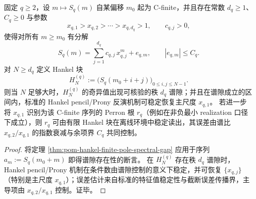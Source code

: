 \begin{corollary}\label{cor:pom-collision-perron-auditable-inversion}
固定 \(q\ge 2\)，设 \(m\mapsto S_q(m)\) 自某偏移 \(m_0\) 起为 C-finite，并且存在常数 \(d_q\ge 1\)、\(C_q\ge 0\) 与参数
\[
x_{q,1}>x_{q,2}>\cdots>x_{q,d_q}>1,
\qquad
c_{q,j}>0,
\]
使得对所有 \(m\ge m_0\) 有分解
\[
S_q(m)=\sum_{j=1}^{d_q}c_{q,j}\,x_{q,j}^{m}+e_{q,m},
\qquad
|e_{q,m}|\le C_q.
\]
对 \(N\ge d_q\) 定义 Hankel 块
\[
H_{N}^{(q)}:=\bigl(S_q(m_0+i+j)\bigr)_{0\le i,j\le N-1}.
\]
则当 \(N\) 足够大时，\(H_N^{(q)}\) 的奇异值出现可核验的秩 \(d_q\) 谱隙；并且在谱隙成立的区间内，标准的 Hankel pencil/Prony 反演机制可稳定恢复主尺度 \(x_{q,1}\)。
若进一步将 \(x_{q,1}\) 识别为该 C-finite 序列的 Perron 根 \(r_q\)（例如在非负最小 realization 口径下成立），则 \(r_q\) 可由有限 Hankel 块在离线环境中稳定读出，其误差由谱比 \(x_{q,2}/x_{q,1}\) 的指数衰减与余项界 \(C_q\) 共同控制。
\end{corollary}
\begin{proof}
将定理 \ref{thm:pom-hankel-finite-pole-spectral-gap} 应用于序列 \(a_m:=S_q(m_0+m)\) 即得谱隙存在性的断言。
在 \(H_N^{(q)}\) 存在秩 \(d_q\) 谱隙时，Hankel pencil/Prony 机制在条件数由谱隙控制的意义下稳定，并可恢复 \(\{x_{q,j}\}\)（特别是主尺度 \(x_{q,1}\)）；误差估计来自标准的特征值稳定性与截断误差传播界，主导项由 \(x_{q,2}/x_{q,1}\) 控制。证毕。
\end{proof}

\endinput
